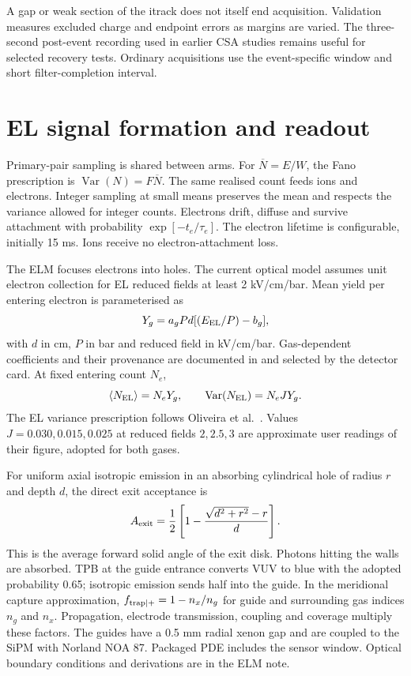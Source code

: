 \documentclass[11pt,a4paper]{article}
\newcommand{\code}[1]{\path{#1}}
\begin{document}
A gap or weak section of the itrack does not itself end acquisition. Validation
measures excluded charge and endpoint errors as margins are varied. The
three-second post-event recording used in earlier CSA studies remains useful
for selected recovery tests. Ordinary acquisitions use the event-specific
window and short filter-completion interval.

\section{EL signal formation and readout}
\label{sec:el}
Primary-pair sampling is shared between arms. For $\overline N=E/W$, the Fano
prescription is $\operatorname{Var}(N)=F\overline N$. The same realised count
feeds ions and electrons. Integer sampling at small means preserves the mean
and respects the variance allowed for integer counts. Electrons drift,
diffuse and survive attachment with probability $\exp[-t_e/\tau_e]$.
The electron lifetime is configurable, initially 15 ms. Ions receive no
electron-attachment loss.

The ELM focuses electrons into holes. The current optical model assumes unit
electron collection for EL reduced fields at least 2 kV/cm/bar. Mean yield per
entering electron is parameterised as
\begin{equation}
 Y_g=a_g P d[(E_{\rm EL}/P)-b_g],
\end{equation}
with $d$ in cm, $P$ in bar and reduced field in kV/cm/bar. Gas-dependent
coefficients and their provenance are documented in \code{../../docs/elm.tex}
and selected by the detector card. At fixed entering count $N_e$,
\begin{equation}
 \langle N_{\rm EL}\rangle=N_eY_g,\qquad
 \operatorname{Var}(N_{\rm EL})=N_eJY_g.
\end{equation}
The EL variance prescription follows Oliveira et al.~\cite{Oliveira:2011xk}.
Values $J=0.030,0.015,0.025$ at reduced fields $2,2.5,3$ are approximate user
readings of their figure, adopted for both gases.

For uniform axial isotropic emission in an absorbing cylindrical hole of
radius $r$ and depth $d$, the direct exit acceptance is
\begin{equation}
 A_{\rm exit}=\frac12\left[1-\frac{\sqrt{d^2+r^2}-r}{d}\right].
\end{equation}
This is the average forward solid angle of the exit disk. Photons hitting the
walls are absorbed. TPB at the guide entrance converts VUV to blue with the
adopted probability 0.65; isotropic emission sends half into the guide. In the
meridional capture approximation, $f_{\rm trap|+}=1-n_x/n_g$ for guide and
surrounding gas indices $n_g$ and $n_x$. Propagation, electrode transmission,
coupling and coverage multiply these factors. The guides have a 0.5 mm radial
xenon gap and are coupled to the SiPM with Norland NOA 87. Packaged PDE includes
the sensor window. Optical boundary conditions and derivations are in the ELM
note.
\end{document}
